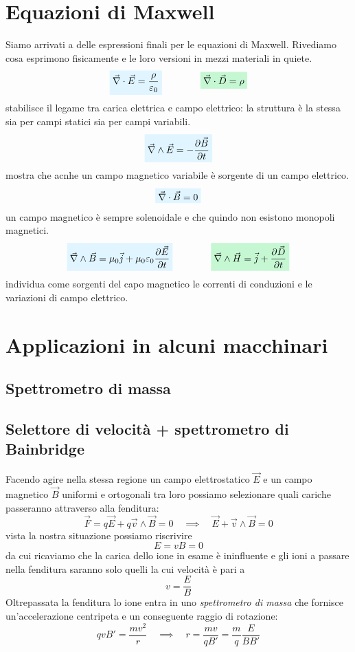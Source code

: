\documentclass[x11names]{report}
\begin{document}
\section{Equazioni di Maxwell}
Siamo arrivati a delle espressioni finali per le equazioni di Maxwell. Rivediamo cosa esprimono fisicamente e le loro versioni in mezzi materiali in quiete.
\[
\viola{\vec{\nabla}\cdot \vec{E} = \frac{\rho}{\varepsilon_0}} \qquad \qquad \rosso{\vec{\nabla}\cdot \vec{D} = \rho}
\]
stabilisce il legame tra carica elettrica e campo elettrico: la struttura è la stessa sia per campi statici sia per campi variabili.
\[
\viola{\vec{\nabla}\wedge \vec{E} = -\frac{\partial \vec{B}}{\partial t}} 
\]
mostra che acnhe un campo magnetico variabile è sorgente di un campo elettrico.
\[
\viola{\vec{\nabla}\cdot \vec{B} = 0}
\]
un campo magnetico è sempre solenoidale e che quindo non esistono monopoli magnetici.
\[
\viola{\vec{\nabla}\wedge \vec{B} = \mu_0 \vec{j} + \mu_0\varepsilon_0\frac{\partial\vec{E}}{\partial t}} \qquad \qquad \rosso{\vec{\nabla} \wedge \vec{H} = \vec{j} + \frac{\partial \vec{D}}{\partial t}}
\]
individua come sorgenti del capo magnetico le correnti di conduzioni e le variazioni di campo elettrico.
\newpage
\section{Applicazioni in alcuni macchinari}
\subsection{Spettrometro di massa}
\subsection{Selettore di velocità + spettrometro di Bainbridge}
\begin{figure}
\end{figure}
Facendo agire nella stessa regione un campo elettrostatico \(\vec{E}\) e un campo magnetico \(\vec{B}\) uniformi e ortogonali tra loro possiamo selezionare quali cariche passeranno attraverso alla fenditura:
\[
\vec{F} = q\vec{E} + q\vec{v}\wedge\vec{B} = 0 \quad \implies\quad \vec{E} + \vec{v} \wedge \vec{B} = 0
\]
vista la nostra situazione possiamo riscrivire
\[
E = vB = 0
\]
da cui ricaviamo che la carica dello ione in esame è ininfluente e gli ioni a passare nella fenditura saranno solo quelli la cui velocità è pari a
\[
v = \frac{E}{B}
\]
Oltrepassata la fenditura lo ione entra in uno \textit{spettrometro di massa} che fornisce un'accelerazione centripeta e un conseguente raggio di rotazione:
\[
qvB' = \frac{mv^2}{r} \quad \implies \quad r = \frac{mv}{qB'} = \frac{m}{q}\frac{E}{BB'}
\]
\end{document}
